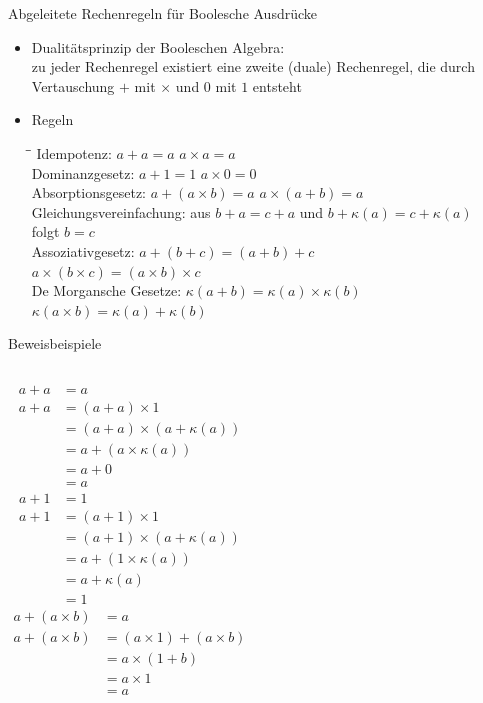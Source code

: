\begin{frame}{Abgeleitete Rechenregeln für Boolesche Ausdrücke}
	\begin{itemize}
		\item Dualitätsprinzip der Booleschen Algebra:\\
			zu jeder Rechenregel existiert eine zweite (duale) Rechenregel, die durch Vertauschung $+$ mit $\times$ und $0$ mit $1$ entsteht
		\item Regeln\\
		\begin{tabbing}
		\hspace{12em}\=\hspace{8em}\=\kill
		Idempotenz:	\> $a+a=a$  \> $a\times a = a$\\ 
		Dominanzgesetz:	\> $a+1=1$ \> $a\times 0 = 0$\\
		Absorptionsgesetz:	\> $a+(a\times b) = a$ \> $a \times (a + b) = a$\\ 
		Gleichungsvereinfachung:	\> aus $b+a=c+a$ und $b+\kappa(a)=c+\kappa(a)$ \\ 
									\> folgt $b=c$ \\ 
		Assoziativgesetz:	\> $a+(b+c)=(a+b)+c$ \\ 
							\> $a\times (b\times c)=(a\times b)\times c$ \\ 
		De Morgansche Gesetze:	\> $\kappa(a+b) = \kappa(a) \times \kappa(b)$ \\ 
								\> $\kappa(a\times b) = \kappa(a) + \kappa(b)$   
		\end{tabbing} 
	\end{itemize}
\end{frame}

\begin{frame}{Beweisbeispiele}
	\begin{columns}
		\begin{align*}
			a+a&=a\\
			a+a&=(a+a)\times 1\\
			   &=(a+a)\times (a+\kappa(a))\\
			   &=a+(a\times \kappa(a))\\
			   &=a+0\\
			   &=a
		\end{align*}
		\begin{align*}
			a+1&=1\\
			a+1&=(a+1)\times 1\\
			&=(a+1)\times (a+\kappa(a))\\
			&=a+(1\times \kappa(a))\\
			&=a+\kappa(a)\\
			&=1
		\end{align*}
		\begin{align*}
			a+(a\times b)&=a\\
			a+(a\times b)&=(a\times 1)+(a\times b)\\
			&=a\times (1+b)\\
			&=a\times 1\\
			&=a\\
		\end{align*}
	\end{columns}	
\end{frame}

